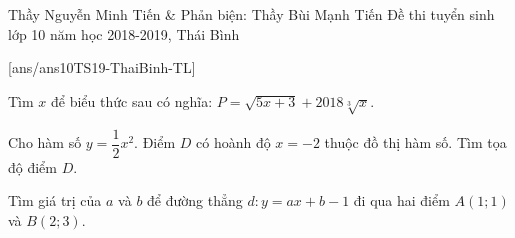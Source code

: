 \begin{name}
{Thầy Nguyễn Minh Tiến \& Phản biện: Thầy Bùi Mạnh Tiến}
{Đề thi tuyển sinh lớp 10 năm học 2018-2019, Thái Bình}
\end{name}
\setcounter{bt}{0}
[ans/ans10TS19-ThaiBinh-TL]
\begin{bt}%
Tìm $x$ để biểu thức sau có nghĩa: $P = \sqrt{5x + 3} + 2018\sqrt[3]{x}$.
\end{bt}
\begin{bt}%
Cho hàm số $y = \dfrac{1}{2}x^2$. Điểm $D$ có hoành độ $x = - 2$ thuộc đồ thị hàm số. Tìm tọa độ điểm $D$.
\end{bt}
\begin{bt}%
Tìm giá trị của $a$ và $b$ để đường thẳng $d: y = ax + b - 1$ đi qua hai điểm $A\left(1;1\right)$ và $B\left(2;3\right)$.
\end{bt}
